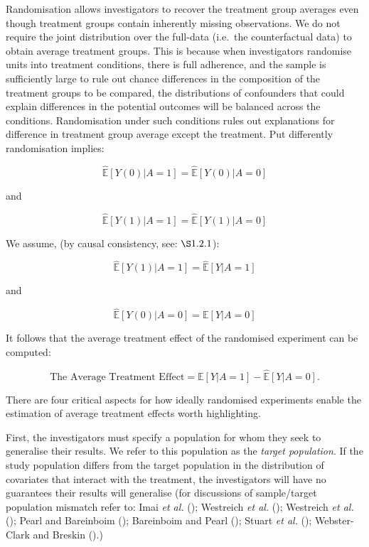 \documentclass[
  single column]{article}
\begin{document}
Randomisation allows investigators to recover the treatment group
averages even though treatment groups contain inherently missing
observations. We do not require the joint distribution over the
full-data (i.e.~the counterfactual data) to obtain average treatment
groups. This is because when investigators randomise units into
treatment conditions, there is full adherence, and the sample is
sufficiently large to rule out chance differences in the composition of
the treatment groups to be compared, the distributions of confounders
that could explain differences in the potential outcomes will be
balanced across the conditions. Randomisation under such conditions
rules out explanations for difference in treatment group average except
the treatment. Put differently randomisation implies:

\[
\widehat{\mathbb{E}}[Y(0) | A = 1] = \widehat{\mathbb{E}}[Y(0) | A = 0]
\]

and

\[
\widehat{\mathbb{E}}[Y(1) | A = 1] = \widehat{\mathbb{E}}[Y(1) | A = 0]
\]

We assume, (by causal consistency, see: \(\S 1.2.1\)):

\[\widehat{\mathbb{E}}[Y(1) | A = 1] = \widehat{\mathbb{E}}[Y| A = 1]\]

and

\[\widehat{\mathbb{E}}[Y(0) | A = 0] = {\mathbb{E}}[Y| A = 0]\]

It follows that the average treatment effect of the randomised
experiment can be computed:

\[
\text{The Average Treatment Effect} = {\mathbb{E}}[Y | A = 1] - \widehat{\mathbb{E}}[Y | A = 0].
\]

There are four critical aspects for how ideally randomised experiments
enable the estimation of average treatment effects worth highlighting.

First, the investigators must specify a population for whom they seek to
generalise their results. We refer to this population as the
\emph{target population}. If the study population differs from the
target population in the distribution of covariates that interact with
the treatment, the investigators will have no guarantees their results
will generalise (for discussions of sample/target population mismatch
refer to: Imai \emph{et al.}
(); Westreich \emph{et
al.} (); Westreich \emph{et al.}
(); Pearl and Bareinboim
(); Bareinboim and Pearl
(); Stuart \emph{et al.}
(); Webster-Clark and
Breskin ().)
\end{document}
